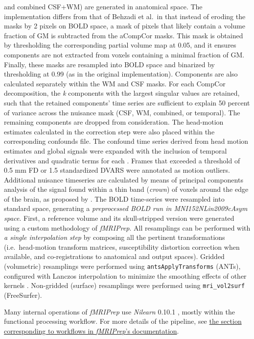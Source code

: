 \documentclass[
]{article}
\begin{document}
\begin{description}
and combined CSF+WM) are generated in anatomical space. The
implementation differs from that of Behzadi et al.~in that instead of
eroding the masks by 2 pixels on BOLD space, a mask of pixels that
likely contain a volume fraction of GM is subtracted from the aCompCor
masks. This mask is obtained by thresholding the corresponding partial
volume map at 0.05, and it ensures components are not extracted from
voxels containing a minimal fraction of GM. Finally, these masks are
resampled into BOLD space and binarized by thresholding at 0.99 (as in
the original implementation). Components are also calculated separately
within the WM and CSF masks. For each CompCor decomposition, the
\emph{k} components with the largest singular values are retained, such
that the retained components' time series are sufficient to explain 50
percent of variance across the nuisance mask (CSF, WM, combined, or
temporal). The remaining components are dropped from consideration. The
head-motion estimates calculated in the correction step were also placed
within the corresponding confounds file. The confound time series
derived from head motion estimates and global signals were expanded with
the inclusion of temporal derivatives and quadratic terms for each
\citep{confounds_satterthwaite_2013}. Frames that exceeded a threshold
of 0.5 mm FD or 1.5 standardized DVARS were annotated as motion
outliers. Additional nuisance timeseries are calculated by means of
principal components analysis of the signal found within a thin band
(\emph{crown}) of voxels around the edge of the brain, as proposed by
\citep{patriat_improved_2017}. The BOLD time-series were resampled into
standard space, generating a \emph{preprocessed BOLD run in
MNI152NLin2009cAsym space}. First, a reference volume and its
skull-stripped version were generated using a custom methodology of
\emph{fMRIPrep}. All resamplings can be performed with \emph{a single
interpolation step} by composing all the pertinent transformations
(i.e.~head-motion transform matrices, susceptibility distortion
correction when available, and co-registrations to anatomical and output
spaces). Gridded (volumetric) resamplings were performed using
\texttt{antsApplyTransforms} (ANTs), configured with Lanczos
interpolation to minimize the smoothing effects of other kernels
\citep{lanczos}. Non-gridded (surface) resamplings were performed using
\texttt{mri\_vol2surf} (FreeSurfer).
\end{description}

Many internal operations of \emph{fMRIPrep} use \emph{Nilearn} 0.10.1
\citep[RRID:SCR\_001362]{nilearn}, mostly within the functional
processing workflow. For more details of the pipeline, see
\href{https://fmriprep.readthedocs.io/en/latest/workflows.html}{the
section corresponding to workflows in \emph{fMRIPrep}'s documentation}.
\end{document}
